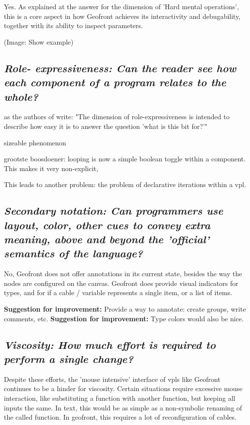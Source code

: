 Yes. 
As explained at the answer for the dimension of 'Hard mental operations', this is a core aspect in how Geofront achieves its interactivity and debugability, together with its ability to inspect parameters. 

(Image: Show example)

\subsection*{\emph{Role- expressiveness: Can the reader see how each component of a program relates to the whole? }}

as the authors of \cite[]{green_usability_1996} write: "The dimension of role-expressiveness is intended to describe how easy it is to answer the question 'what is this bit for?'"

sizeable phenomenon

grootste boosdoener: looping is now a simple boolean toggle within a component. 
This makes it very non-explicit, 

This leads to another problem: the problem of declarative iterations within a vpl. 


\subsection*{\emph{Secondary notation: Can programmers use layout, color, other cues to convey extra meaning, above and beyond the 'official' semantics of the language? }}

No, Geofront does not offer annotations in its current state, besides the way the nodes are configured on the canvas.  
Geofront does provide visual indicators for types, and for if a cable / variable represents a single item, or a list of items.

\textbf{Suggestion for improvement:} Provide a way to annotate: create groups, write comments, etc. 
\textbf{Suggestion for improvement:} Type colors would also be nice.

\subsection*{\emph{Viscosity: How much effort is required to perform a single change? }}

Despite these efforts, the 'mouse intensive' interface of vpls like Geofront continues to be a hinder for viscosity.
Certain situations require excessive mouse interaction, like substituting a function with another function, but keeping all inputs the same.
In text, this would be as simple as a non-symbolic renaming of the called function.
In geofront, this requires a lot of reconfiguration of cables. 

